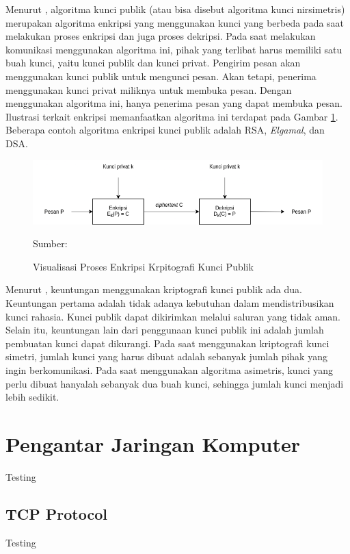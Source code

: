 Menurut \textcite{munir2019}, algoritma kunci publik (atau bisa disebut algoritma kunci nirsimetris) merupakan algoritma enkripsi yang menggunakan kunci yang berbeda pada saat melakukan proses enkripsi dan juga proses dekripsi. Pada saat melakukan komunikasi menggunakan algoritma ini, pihak yang terlibat harus memiliki satu buah kunci, yaitu kunci publik dan kunci privat. Pengirim pesan akan menggunakan kunci publik untuk mengunci pesan. Akan tetapi, penerima menggunakan kunci privat miliknya untuk membuka pesan. Dengan menggunakan algoritma ini, hanya penerima pesan yang dapat membuka pesan. Ilustrasi terkait enkripsi memanfaatkan algoritma ini terdapat pada Gambar \ref{fig:crypto.asymetric}. Beberapa contoh algoritma enkripsi kunci publik adalah RSA, \emph{Elgamal}, dan DSA.

\begin{figure}[!h]
  \centering
  \includegraphics[width=\textwidth]{chapters/res/chapter-2/img/crypto.symetric.png}
  \caption{Visualisasi Proses Enkripsi Krpitografi Kunci Publik} 
  \label{fig:crypto.asymetric}
  Sumber: \textcite{munir2019}
\end{figure}

Menurut \textcite{munir2019}, keuntungan menggunakan kriptografi kunci publik ada dua. Keuntungan pertama adalah tidak adanya kebutuhan dalam mendistribusikan kunci rahasia. Kunci publik dapat dikirimkan melalui saluran yang tidak aman. Selain itu, keuntungan lain dari penggunaan kunci publik ini adalah jumlah pembuatan kunci dapat dikurangi. Pada saat menggunakan kriptografi kunci simetri, jumlah kunci yang harus dibuat adalah sebanyak jumlah pihak yang ingin berkomunikasi. Pada saat menggunakan algoritma asimetris, kunci yang perlu dibuat hanyalah sebanyak dua buah kunci, sehingga jumlah kunci menjadi lebih sedikit. 



\section{Pengantar Jaringan Komputer}
Testing 

\subsection{TCP Protocol}
Testing


